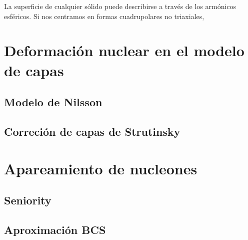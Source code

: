 La superficie de cualquier sólido puede describirse a través de los armónicos esféricos. Si nos centramos en formas cuadrupolares no triaxiales, 

\section{Deformación nuclear en el modelo de capas}

\subsection{Modelo de Nilsson}

\subsection{Correción de capas de Strutinsky}


\section{Apareamiento de nucleones}

\subsection{Seniority}


\subsection{Aproximación BCS}

